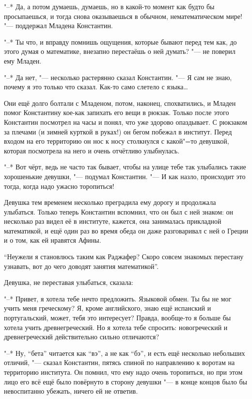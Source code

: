 "--* Да, а потом думаешь, думаешь, но в какой-то момент как будто бы
просыпаешься, и тогда снова оказываешься в обычном, нематематическом мире!
"--- поддержал Младена Константин.

"--* Ты что, и вправду помнишь ощущения, которые бывают перед тем как, до этого
думая о математике, внезапно перестаёшь о ней думать? "--- не поверил ему Младен.

"--* Да нет, "--- несколько растерянно сказал Константин.
"--- Я сам не знаю, почему я это только что сказал.
Как-то само слетело с языка\ldots

Они ещё долго болтали с Младеном, потом, наконец, спохватились, и Младен помог
Константину кое-как запихать его вещи в рюкзак.
Только после этого Константин посмотрел на часы и понял, что уже здорово
опаздывает.
С рюкзаком за плечами (и зимней курткой в руках!) он бегом побежал в институт.
Перед входом на его территорию он нос к носу столкнулся с какой"=то девушкой,
которая посмотрела на него и очень отчётливо улыбнулась.

"--* Вот чёрт, ведь не часто так бывает, чтобы на улице тебе так улыбались
такие хорошенькие девушки, "--- подумал Константин.
"--- И как назло, происходит это тогда, когда надо ужасно торопиться!

Девушка тем временем несколько преградила ему дорогу и продолжала улыбаться.
Только теперь Константин вспомнил, что он был с ней знаком: он несколько раз
видел её в институте, кажется, она занималась прикладной математикой, и ещё один
раз во время обеда он даже разговаривал с ней о Греции и о том, как ей нравятся
Афины.

\enquote{Неужели я становлюсь таким как Раджафер?
Скоро совсем знакомых перестану узнавать, вот до чего доводят занятия
математикой}.

Девушка, не переставая улыбаться, сказала:

"--* Привет, я хотела тебе нечто предложить.
Языковой обмен.
Ты бы не мог учить меня греческому?
Я, кроме английского, знаю ещё испанский и португальский, может, тебя это
интересует?
Правда, вообще-то я больше бы хотела учить древнегреческий.
Но я хотела тебе спросить: новогреческий и древнегреческий действительно сильно
отличаются?

"--* Ну, \enquote{бета} читается как \enquote{вэ}, а не как \enquote{бэ}, и есть
ещё несколько небольших отличий, "--- сказал Константин, пятясь спиной по
направлению к воротам на территорию института.
Он помнил, что ему надо очень торопиться, но при этом лицо его всё ещё было
повёрнуто в сторону девушки "--- в конце концов было бы невоспитанно убежать,
ничего ей не ответив.

